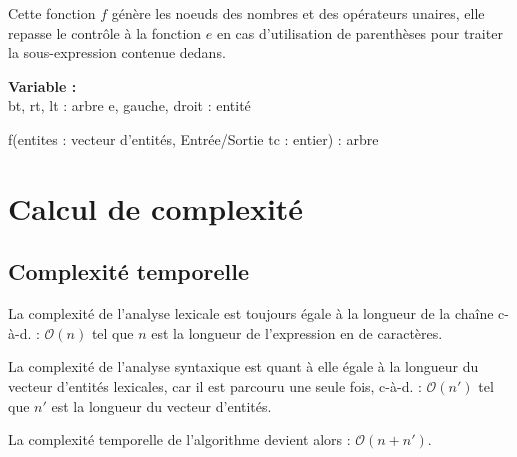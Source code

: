 \par
Cette fonction $f$ génère les noeuds des nombres et des opérateurs unaires, elle repasse le contrôle à la fonction $e$ en cas d'utilisation de parenthèses pour traiter la sous-expression contenue dedans.\\
\begin{function}[H]
    \textbf{Variable :}\\
    bt, rt, lt : arbre\;
    e, gauche, droit : entité\;
    \caption{f(entites : vecteur d'entités, Entrée/Sortie tc : entier) : arbre}
\end{function}

\section{Calcul de complexité}
\subsection{Complexité temporelle}
La complexité de l'analyse lexicale est toujours égale à la longueur de la chaîne c-à-d. : $\mathcal{O}(n)$ tel que $n$ est la longueur de l'expression en de caractères.
\par
La complexité de l'analyse syntaxique est quant à elle égale à la longueur du vecteur d'entités lexicales, car il est parcouru une seule fois, c-à-d. : $\mathcal{O}(n')$ tel que $n'$ est la longueur du vecteur d'entités.
\par
La complexité temporelle de l'algorithme devient alors : $\mathcal{O}(n + n')$.

